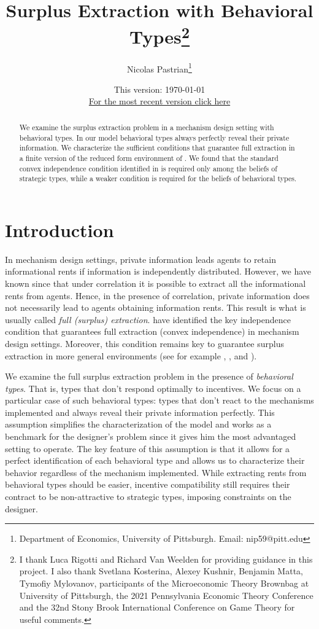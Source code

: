 \documentclass[12pt]{article}
\title{Surplus Extraction with Behavioral Types\thanks{I thank Luca Rigotti and Richard Van Weelden for providing guidance in this project. I also thank Svetlana Kosterina, Alexey Kushnir, Benjamin Matta, Tymofiy Mylovanov, participants of the Microeconomic Theory Brownbag at University of Pittsburgh, the 2021 Pennsylvania Economic Theory Conference and the 32nd Stony Brook International Conference on Game Theory for useful comments.}}%
\author{Nicolas Pastrian\thanks{Department of Economics, University of Pittsburgh. Email: nip59@pitt.edu}}
\date{This version: \today\\\href{https://nrpastrian.github.io/files/surplus_extraction_behavioral.pdf}{For the most recent version click here}}
\begin{document}
\maketitle
	\begin{abstract}
		We examine the surplus extraction problem in a mechanism design setting with behavioral types. In our model behavioral types always perfectly reveal their private information.  We characterize the sufficient conditions that guarantee full extraction in a finite version of the reduced form environment of \citet{mcafeereny1992}. We found that the standard convex independence condition identified in \citet{cremermclean1988} is required only among the beliefs of strategic types, while a weaker condition is required for the beliefs of behavioral types. %
	\end{abstract}

\section{Introduction}
In mechanism design settings, private information leads agents to retain informational rents if information is independently distributed. However, we have known since \citet{myerson1981} that under correlation it is possible to extract all the informational rents from agents. Hence, in the presence of correlation, private information does not necessarily lead to agents obtaining information rents. This result is what is usually called \textit{full (surplus) extraction}. \citet{cremermclean1988} have identified the key independence condition that guarantees full extraction (convex independence) in mechanism design settings. Moreover, this condition remains key to guarantee surplus extraction in more general environments (see for example \citet{farinhaluz2013}, \citet{krahmer2020}, and \citet{fuetal2021samples}).

We examine the full surplus extraction problem in the presence of \textit{behavioral types}. That is, types that don't respond optimally to incentives. We focus on a particular case of such behavioral types: types that don't react to the mechanisms implemented and always reveal their private information perfectly. This assumption simplifies the characterization of the model and works as a benchmark for the designer's problem since it gives him the most advantaged setting to operate. The key feature of this assumption is that it allows for a perfect identification of each behavioral type and allows us to characterize their behavior regardless of the mechanism implemented. While extracting rents from behavioral types should be easier, incentive compatibility still requires their contract to be non-attractive to strategic types, imposing constraints on the designer. 
\end{document}
